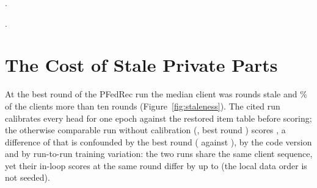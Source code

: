 \begin{table}[htbp]
  \caption{Parameters per placement. $^{\dagger}$Counted from the architecture; the measured
  size of the Flower messages is pending.}
  \label{tab:params-comm}
  \centering\small
  \fittable{}
\end{table}

.

.

\section{The Cost of Stale Private Parts}
\label{sec:res-staleness}

At the best round of the PFedRec run the median client was \StaleMedian{} rounds stale and
\StaleOverTen\% of the clients more than ten rounds (Figure~\ref{fig:staleness}). The cited run
calibrates every head for one epoch against the restored item table before scoring; the
otherwise comparable run without calibration (\RunPfedrecNocalShort, best round
\RunPfedrecNocalBestRound) scores \NdcgPfedrecNocal, a difference of \DeltaPfedrecCalibration{}
that is confounded by the best round (\RunPfedrecBestRound{} against
\RunPfedrecNocalBestRound), by the code version and by run-to-run training variation: the two
runs share the same client sequence, yet their in-loop scores at the same round differ by up to
\DeltaInLoopNocalMax{} (the local data order is not seeded).

